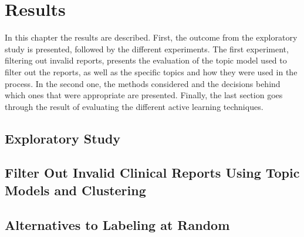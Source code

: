 \chapter{Results}
\label{cha:results}




In this chapter the results are described.
First, the outcome from the exploratory study is presented, followed by the different experiments.
The first experiment, filtering out invalid reports, presents the evaluation of the topic model used to filter out the reports, as well as the specific topics and how they were used in the process.
In the second one, the methods considered and the decisions behind which ones that were appropriate are presented.
Finally, the last section goes through the result of evaluating the different active learning techniques.

\section{Exploratory Study}


\section{Filter Out Invalid Clinical Reports Using Topic Models and Clustering}\label{sec:exp1-result}




\section{Alternatives to Labeling at Random}



